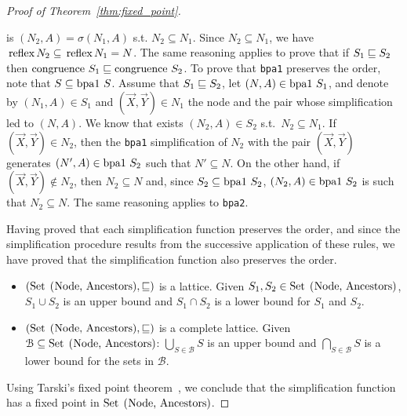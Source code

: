 \begin{proof}[Proof of Theorem~\ref{thm:fixed_point}]
\begin{itemize}
        is $(N_2,A)=\sigma(N_1,A)$ s.t. $N_2\subseteq N_1$.  Since
        $N_2\subseteq N_1$, we have
        $\text{\lstinline{reflex}} N_2 \subseteq
        \text{\lstinline{reflex}} N_1 = N$.  The same reasoning
        applies to prove that if $S_1\sqsubseteq S_2$ then
        $\text{\lstinline{congruence} }
        S_1\leqSets\text{\lstinline{congruence} }S_2$.
%
	To prove that \lstinline{bpa1} preserves the order,
	note that 
	$S \subseteq \text{\lstinline{bpa1} }S$. Assume that 
	$S_1\sqsubseteq S_2$, let $(N,A)\in \text{\lstinline{bpa1} }S_1$, 
	and denote by $(N_1,A)\in S_1$ and $(\vec X,\vec Y)\in N_1$  
	the node and the pair whose simplification 
	led to $(N,A)$. We know that exists $(N_2,A)\in S_2$
	s.t.\ $N_2 \subseteq N_1$. If $(\vec X,\vec Y)\in N_2$,
	then the \lstinline{bpa1} simplification of $N_2$ with
	the pair $(\vec X,\vec Y)$ generates 
	$(N',A)\in \text{\lstinline{bpa1} }S_2$ such that 
	$N'\subseteq N$. On the other hand, if 
	$(\vec X,\vec Y)\not \in N_2$, then $N_2\subseteq N$ 
	and, since  $S_2 \subseteq \text{\lstinline{bpa1} }S_2$,
	$(N_2,A)\in \text{\lstinline{bpa1} }S_2$ is such that
	$N_2\subseteq N$.
	The same reasoning applies to \lstinline{bpa2}. 
      \end{itemize}
      
      Having proved that each simplification function preserves the
      order, and since the simplification procedure results from the
      successive application of these rules, we have proved that the
      simplification function also preserves the order.\smallskip
      \begin{itemize}
      \item $(\text{\lstinline{Set (Node, Ancestors)}}, \leqSets)$ is
        a lattice. Given
        $S_1, S_2\in \text{\lstinline{Set (Node, Ancestors)}}$,
        $S_1 \cup S_2$ is an upper bound and $S_1 \cap S_2$ is a lower
        bound for $S_1$ and $S_2$.
      \item $(\text{\lstinline{Set (Node, Ancestors)}}, \leqSets)$ is
        a complete lattice. Given
      $\mathcal{B}\subseteq \text{\lstinline{Set (Node, Ancestors)}}$:
      $\bigcup_{S\in \mathcal{B}} S$ is an upper bound and
      $\bigcap_{S\in \mathcal{B}} S$ is a lower bound for the sets in
      $\mathcal{B}$.
    \end{itemize}
    Using Tarski's fixed point theorem~\cite{tarski1955lattice}, we
    conclude that the simplification function has a fixed point in
    $\text{\lstinline{Set (Node, Ancestors)}}$.
\end{proof}


